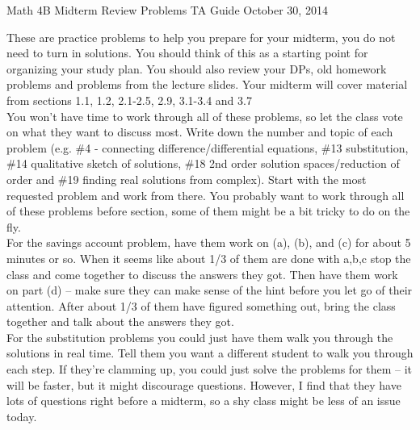 \documentclass[12pt]{article}
\newcommand{\noi}{\noindent}
\begin{document}
\begin{center}
Math 4B Midterm Review Problems
\vskip 2mm
TA Guide
\vskip 2mm
October 30, 2014
  
\end{center}

\noindent These are practice problems to help you prepare for your midterm, you do not need to turn in solutions.  You should think of this as a starting point for organizing your study plan.   You should also review your DPs, old homework problems and problems from the lecture slides.
\vskip 2mm
\noi Your midterm will cover material from sections 1.1, 1.2, 2.1-2.5, 2.9, 3.1-3.4 and 3.7  \\


\noi{\bf Getting Started }You won't have time to work through all of these problems, so let the class vote on what they want to discuss most.  Write down the number and topic of each problem (e.g. \#4 - connecting difference/differential equations,  \#13 substitution, \#14 qualitative sketch of solutions, \#18 2nd order solution spaces/reduction of order and \#19 finding real solutions from complex).  Start with the most requested problem and work from there.  You probably want to work through all of these problems before section, some of them might be a bit tricky to do on the fly.\\

\noi{\bf For \#4.} For the savings account problem, have them work on (a), (b), and (c) for about 5 minutes or so.  When it seems like about 1/3 of them are done with a,b,c stop the class and come together to discuss the answers they got.  Then have them work on part (d) -- make sure they can make sense of the hint before you let go of their attention.  After about 1/3 of them have figured something out, bring the class together and talk about the answers they got.\\

\noi{\bf For \#13.}  For the substitution problems you could just have them walk you through the solutions in real time.  Tell them you want a different student to walk you through each step.  If they're clamming up, you could just solve the problems for them -- it will be faster, but it might discourage questions.  However, I find that they have lots of questions right before a midterm, so a shy class might be less of an issue today.\\
\end{document}
